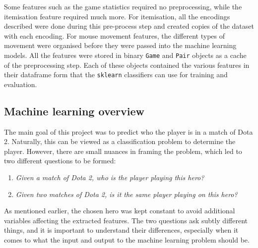 \documentclass[Report.tex]{subfiles}
\begin{document}
Some features such as the game statistics required no preprocessing, while the itemisation feature required much more. For itemisation, all the encodings described were done during this pre-process step and created copies of the dataset with each encoding. For mouse movement features, the different types of movement were organised before they were passed into the machine learning models. All the features were stored in binary \texttt{Game} and \texttt{Pair} objects as a cache of the preprocessing step. Each of these objects contained the various features in their dataframe form that the \texttt{sklearn} classifiers can use for training and evaluation.


\subsection{Machine learning overview}
The main goal of this project was to predict who the player is in a match of Dota 2. Naturally, this can be viewed as a classification problem to determine the player. However, there are small nuances in framing the problem, which led to two different questions to be formed:

\begin{enumerate}
\item \textit{Given a match of Dota 2, who is the player playing this hero?}
\item \textit{Given two matches of Dota 2, is it the same player playing on this hero?}
\end{enumerate}

As mentioned earlier, the chosen hero was kept constant to avoid additional variables affecting the extracted features. The two questions ask subtly different things, and it is important to understand their differences, especially when it comes to what the input and output to the machine learning problem should be. 
\end{document}
